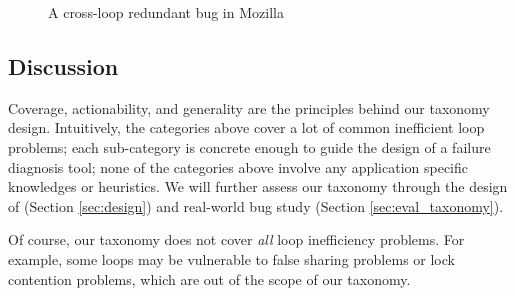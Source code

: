 \begin{figure}
\centering
{}
  \mbox{}
\caption{A cross-loop redundant bug in Mozilla }
\label{fig:Mozilla477564}
\end{figure}



\subsection{Discussion}
Coverage, actionability, and generality are the principles behind our taxonomy
design. Intuitively, the categories above cover a lot of common inefficient
loop problems; each sub-category is concrete enough to guide the design of a
failure diagnosis tool; none of the categories above involve any application
specific knowledges or heuristics. We will further assess our taxonomy
through the design of \Tool (Section \ref{sec:design}) and 
real-world bug study (Section \ref{sec:eval_taxonomy}).

Of course, our taxonomy does not cover \emph{all} loop inefficiency problems.
For example, some loops may be vulnerable to false sharing problems or lock
contention problems, which are out of the scope of our taxonomy. 
